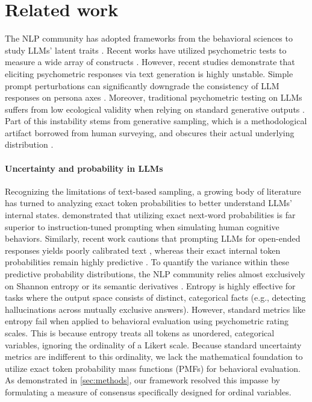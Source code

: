 \section{Related work}
\label{related-work}

The NLP community has adopted frameworks from the behavioral sciences to study LLMs' latent traits \citep{ward-etal-2024-evaluating, perez-etal-2023-discovering,wadi2026does}. 
Recent works have utilized psychometric tests to measure a wide array of constructs \citep{jiang-etal-2024-personallm, li-etal-2024-evaluating-psychological, helwe-etal-2025-navigating}. 
However, recent studies demonstrate that eliciting psychometric responses via text generation is highly unstable. 
Simple prompt perturbations can significantly downgrade the consistency of LLM responses on persona axes \citep{shu-etal-2024-dont}. 
Moreover, traditional psychometric testing on LLMs suffers from low ecological validity when relying on standard generative outputs \citep{jung-etal-2026-psychometric}. 
Part of this instability stems from generative sampling, which is a methodological artifact borrowed from human surveying,
and obscures their actual underlying distribution \citep{deas-mckeown-2025-artificial}. 

\paragraph{Uncertainty and probability in LLMs}
Recognizing the limitations of text-based sampling, a growing body of literature has turned to analyzing exact token probabilities to better understand LLMs' internal states. 
\citet{kuribayashi-etal-2024-psychometric} demonstrated that utilizing exact next-word probabilities is far superior to instruction-tuned prompting when simulating human cognitive behaviors. 
Similarly, recent work cautions that prompting LLMs for open-ended responses yields poorly calibrated text \citep{liu2025badworktimecrosscultural}, 
whereas their exact internal token probabilities remain highly predictive 
\citep{bentegeac2025token, kadavath2022language}.
To quantify the variance within these predictive probability distributions, 
the NLP community relies almost exclusively on Shannon entropy or its semantic derivatives \citep{farquhar2024detecting}. 
Entropy is highly effective for tasks where the output space consists of distinct, categorical facts (e.g., detecting hallucinations across mutually exclusive answers). 
However, standard metrics like entropy fail when applied to behavioral evaluation using psychometric rating scales. 
This is because entropy treats all tokens as unordered, categorical variables, ignoring the ordinality of a Likert scale. 
Because standard uncertainty metrics are indifferent to this ordinality, we lack the mathematical foundation to utilize exact token probability mass functions (PMFs) for behavioral evaluation. 
As demonstrated in \ref{sec:methods}, our framework resolved this impasse by formulating a measure of consensus specifically designed for ordinal variables.

